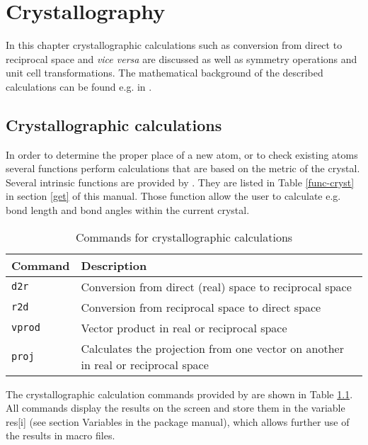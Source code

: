 
\chapter{Crystallography \label{cryst}}

In this chapter crystallographic calculations such as conversion
from direct to reciprocal space and {\it vice versa} are discussed
as well as symmetry operations and unit cell transformations.  The
mathematical background of the described calculations can be found
e.g. in \citet{sands}.


\section{Crystallographic calculations \label{cryst-calc}}

In order to determine the proper place of a new atom, or to check
existing atoms several functions perform calculations that are based
on the metric of the crystal.  Several intrinsic functions are
provided by \discus. They are listed in Table \ref{func-cryst}
in section \ref{get} of this manual.  Those function allow the user
to calculate e.g. bond length and bond angles within the current
crystal. \par
%
\begin{table}[!tbh]
\centering
\begin{tabularx}{\textwidth}{|p{30mm}|X|}
  \hline
  {\bf Command} & {\bf Description} \\
  \hline\hline
  {\tt d2r}     & Conversion from direct (real) space to reciprocal space \\
  {\tt r2d}     & Conversion from reciprocal space to direct space \\
  {\tt vprod}   & Vector product in real or reciprocal space \\
  {\tt proj}    & Calculates the projection from one vector on another in
                  real or reciprocal space \\
  \hline
\end{tabularx}
\caption{\label{cry-tab1}Commands for crystallographic calculations}
\end{table}
%
The crystallographic calculation commands provided by \Discus
are shown in Table \ref{cry-tab1}. All commands display the results
on the screen and store them in the variable res[i] (see section
Variables in the package manual), which allows further use of the 
results in macro files.
\par

